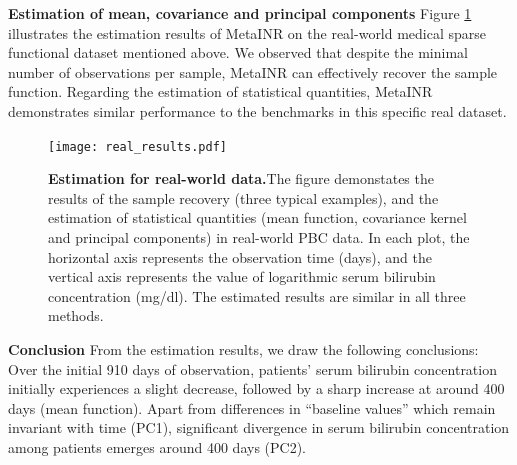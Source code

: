 \documentclass{article}
\begin{document}
\textbf{Estimation of mean, covariance and principal components}
Figure \ref{Estimation for real-world data} illustrates the estimation results of MetaINR on the real-world medical sparse functional dataset mentioned above. 
We observed that despite the minimal number of observations per sample, 
MetaINR can effectively recover the sample function. 
Regarding the estimation of statistical quantities, 
MetaINR demonstrates similar performance to the benchmarks in this specific real dataset.
\begin{figure}[htb]
  \centering
  \texttt{[image: real\_results.pdf]}
  \caption{\textbf{Estimation for real-world data.}The figure demonstates the results of the sample recovery (three typical examples), and the estimation of statistical quantities
  (mean function, covariance kernel and principal components) in real-world PBC data. 
  In each plot, the horizontal axis represents the observation time (days), and the vertical axis represents the value of logarithmic serum bilirubin concentration (mg/dl). 
  The estimated results are similar in all three methods.
  }
  \label{Estimation for real-world data}
\end{figure}

\textbf{Conclusion}
From the estimation results, we draw the following conclusions: 
Over the initial 910 days of observation, patients' serum bilirubin concentration initially experiences a slight decrease, 
followed by a sharp increase at around 400 days (mean function). 
Apart from differences in ``baseline values'' which remain invariant with time (PC1), 
significant divergence in serum bilirubin concentration among patients emerges around 400 days (PC2).
\end{document}
